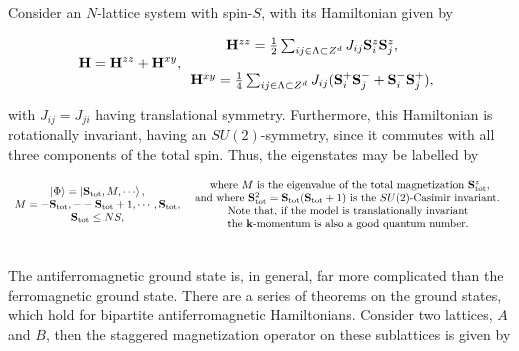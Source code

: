 \documentclass{homework}
\begin{document}
Consider an $N$-lattice system with spin-$S$, with its Hamiltonian given by

\begin{equation}
    {\bf H} = {\bf H}^{zz} + {\bf H}^{xy}, \begin{array}{c}
         {\bf H}^{zz} = \frac{1}{2} \sum_{ij \in \Lambda \subset Z^{d}} J_{ij} {\bf S}_i^z {\bf S}_j^z, \\  
         \\
         {\bf H}^{xy} = \frac{1}{4} \sum_{ij \in \Lambda \subset Z^{d}} J_{ij} ({\bf S}_i^+ {\bf S}_j^- + {\bf S}_i^- {\bf S}_j^+), \\  
    \end{array}
    \label{auerbach's HH hamiltonian}
\end{equation}

with $J_{ij} = J_{ji}$ having translational symmetry. Furthermore, this Hamiltonian is rotationally invariant, having an $SU(2)$-symmetry, since it commutes with all three components of the total spin. Thus, the eigenstates may be labelled by 

\begin{equation}
    \begin{array}{c}
         \ket{\Phi} = \ket{{\bf S}_{\textnormal{tot}}, M, \cdots},  \\
         M = -{\bf S}_{\textnormal{tot}}, - -{\bf S}_{\textnormal{tot}} +1, \cdots,  {\bf S}_{\textnormal{tot}}, \\          {\bf S}_{\textnormal{tot}} \leq NS, 
    \end{array} \begin{array}{c}
         \textnormal{ where $M$ is the eigenvalue of the total magnetization ${\bf S}_{\textnormal{tot}}^z$,}
         \\
         \textnormal{ and where ${\bf S}_{\textnormal{tot}}^2 = {\bf S}_{\textnormal{tot}}({\bf S}_{\textnormal{tot}}+1)$ is the $SU(2)$-Casimir invariant. } \\
         \textnormal{Note that, if the model is translationally invariant} \\
         \textnormal{the ${\bf k}$-momentum is also a good quantum number.}
    \end{array}
\end{equation}

\blanky \\

The antiferromagnetic ground state is, in general, far more complicated than the ferromagnetic ground state. There are a series of theorems on the ground states, which hold for bipartite antiferromagnetic Hamiltonians. Consider two lattices, $A$ and $B$, then the staggered magnetization operator on these sublattices is given by 
\end{document}
